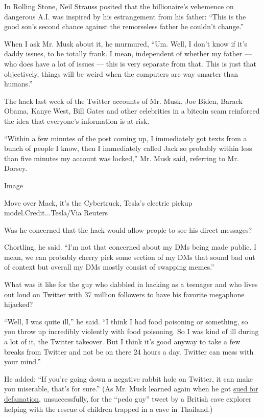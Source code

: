 In Rolling Stone, Neil Strauss posited that the billionaire's vehemence
on dangerous A.I. was inspired by his estrangement from his father:
``This is the good son's second chance against the remorseless father he
couldn't change.''

When I ask Mr. Musk about it, he murmured, ``Um. Well, I don't know if
it's daddy issues, to be totally frank. I mean, independent of whether
my father --- who does have a lot of issues --- this is very separate
from that. This is just that objectively, things will be weird when the
computers are way smarter than humans.''

The hack last week of the Twitter accounts of Mr. Musk, Joe Biden,
Barack Obama, Kanye West, Bill Gates and other celebrities in a bitcoin
scam reinforced the idea that everyone's information is at risk.

``Within a few minutes of the post coming up, I immediately got texts
from a bunch of people I know, then I immediately called Jack so
probably within less than five minutes my account was locked,'' Mr. Musk
said, referring to Mr. Dorsey.

Image

Move over Mack, it's the Cybertruck, Tesla's electric pickup
model.Credit...Tesla/Via Reuters

Was he concerned that the hack would allow people to see his direct
messages?

Chortling, he said. ``I'm not that concerned about my DMs being made
public. I mean, we can probably cherry pick some section of my DMs that
sound bad out of context but overall my DMs mostly consist of swapping
memes.''

What was it like for the guy who dabbled in hacking as a teenager and
who lives out loud on Twitter with 37 million followers to have his
favorite megaphone hijacked?

``Well, I was quite ill,'' he said. ``I think I had food poisoning or
something, so you throw up incredibly violently with food poisoning. So
I was kind of ill during a lot of it, the Twitter takeover. But I think
it's good anyway to take a few breaks from Twitter and not be on there
24 hours a day. Twitter can mess with your mind.''

He added: ``If you're going down a negative rabbit hole on Twitter, it
can make you miserable, that's for sure.'' (As Mr. Musk learned again
when he got
\href{https://www.nytimes3xbfgragh.onion/2019/12/06/business/elon-musk-defamation-verdict.html}{sued
for defamation}, unsuccessfully, for the ``pedo guy'' tweet by a British
cave explorer helping with the rescue of children trapped in a cave in
Thailand.)

